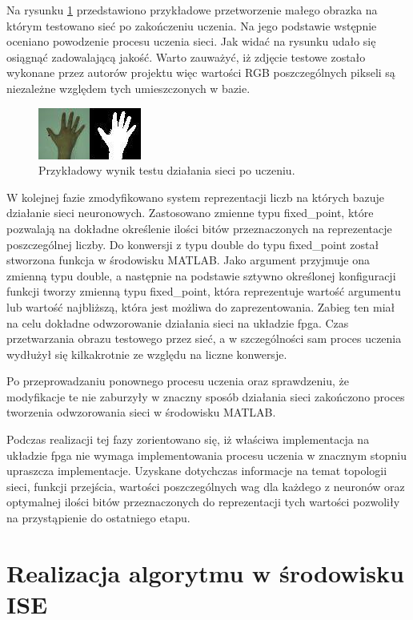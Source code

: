 Na rysunku \ref{fig:reka} przedstawiono przykładowe przetworzenie małego obrazka na którym testowano sieć po zakończeniu uczenia. Na jego podstawie wstępnie oceniano powodzenie procesu uczenia sieci. Jak widać na rysunku udało się osiągnąć zadowalającą jakość. Warto zauważyć, iż zdjęcie testowe zostało wykonane przez autorów projektu więc wartości RGB poszczególnych pikseli są niezależne względem tych umieszczonych w bazie.

\begin{figure}[tbph!]
	\centering
	\includegraphics[width=0.6\linewidth]{images/reka.png}
	\caption{Przykładowy wynik testu działania sieci po uczeniu.}
	\label{fig:reka}
\end{figure}

W kolejnej fazie zmodyfikowano system reprezentacji liczb na których bazuje działanie sieci neuronowych. Zastosowano zmienne typu fixed\_point, które pozwalają na dokładne określenie ilości bitów przeznaczonych na reprezentacje poszczególnej liczby. Do konwersji z typu double do typu fixed\_point został stworzona funkcja w środowisku MATLAB. Jako argument przyjmuje ona zmienną typu double, a następnie na podstawie sztywno określonej konfiguracji funkcji tworzy zmienną typu fixed\_point, która reprezentuje wartość argumentu lub wartość najbliższą, która jest możliwa do zaprezentowania. Zabieg ten miał na celu dokładne odwzorowanie działania sieci na układzie fpga. Czas przetwarzania obrazu testowego przez sieć, a w szczególności sam proces uczenia wydłużył się kilkakrotnie ze względu na liczne konwersje.

Po przeprowadzaniu ponownego procesu uczenia oraz sprawdzeniu, że modyfikacje te nie zaburzyły w znaczny sposób działania sieci zakończono proces tworzenia odwzorowania sieci w środowisku MATLAB. 

Podczas realizacji tej fazy zorientowano się, iż właściwa implementacja na układzie fpga nie wymaga implementowania procesu uczenia w znacznym stopniu upraszcza implementacje. Uzyskane dotychczas informacje na temat topologii sieci, funkcji przejścia, wartości poszczególnych wag dla każdego z neuronów oraz optymalnej ilości bitów przeznaczonych do reprezentacji tych wartości pozwoliły na przystąpienie do ostatniego etapu.

\section{Realizacja algorytmu w środowisku ISE}


